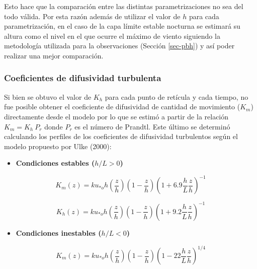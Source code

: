 \documentclass[12pt,spanish,oneside, a4paper]{book}
\providecommand{\tightlist}{%
  \setlength{\itemsep}{0pt}\setlength{\parskip}{0pt}}
\begin{document}
Esto hace que la comparación entre las distintas parametrizaciones no
sea del todo válida. Por esta razón además de utilizar el valor de \(h\)
para cada parametrización, en el caso de la capa límite estable nocturna
se estimará su altura como el nivel en el que ocurre el máximo de viento
siguiendo la metodología utilizada para la observaciones (Sección
\ref{sec-pbh}) y así poder realizar una mejor comparación.

\subsubsection{Coeficientes de difusividad
turbulenta}\label{coeficientes-de-difusividad-turbulenta}

Si bien se obtuvo el valor de \(K_h\) para cada punto de retícula y cada
tiempo, no fue posible obtener el coeficiente de difusividad de cantidad
de movimiento (\(K_m\)) directamente desde el modelo por lo que se
estimó a partir de la relación \(K_m = K_h \: P_r\) donde \(P_r\) es el
número de Prandtl. Este último se determinó calculando los perfiles de
los coeficientes de difusividad turbulentos según el modelo propuesto
por Ulke (2000):

\begin{itemize}
\tightlist
\item
  \textbf{Condiciones estables (\(h/L > 0\))}
\end{itemize}

\begin{equation} \label{k-1}
K_m(z) =  ku_{*o}h\left (\frac{z}{h} \right )\left(1-\frac{z}{h} \right)\left (1 + 6.9\frac{h}{L}\frac{z}{h} \right)^{-1}
\end{equation}

\begin{equation} \label{k-2}
K_h(z) =  ku_{*o}h\left (\frac{z}{h} \right )\left(1-\frac{z}{h} \right)\left (1 + 9.2\frac{h}{L}\frac{z}{h} \right)^{-1}
\end{equation}

\begin{itemize}
\tightlist
\item
  \textbf{Condiciones inestables (\(h/L < 0\))}
\end{itemize}

\begin{equation} \label{k-3}
K_m(z) =  ku_{*o}h\left (\frac{z}{h} \right )\left(1-\frac{z}{h} \right)\left (1 - 22\frac{h}{L}\frac{z}{h} \right)^{1/4}
\end{equation}
\end{document}
